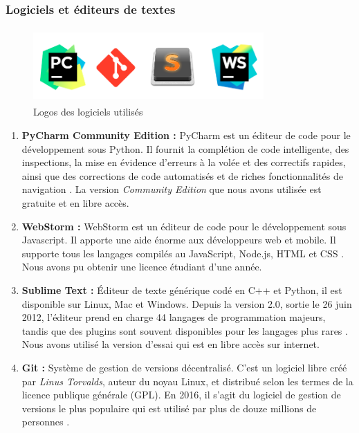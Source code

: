         \subsubsection{Logiciels et éditeurs de textes}
            \begin{figure}[H]
                    \centering
                    \includegraphics[height=80pt,width=250pt]{img/chapter4/tools/software.png}
                    \caption{Logos des logiciels utilisés}
                    \label{}
            \end{figure}
            \begin{enumerate}[leftmargin=*]
                \item{\textbf{PyCharm Community Edition : }}
                PyCharm est un éditeur de code pour le développement sous Python. Il fournit la complétion de code intelligente, des inspections, la mise en évidence d'erreurs à la volée et des correctifs rapides, ainsi que des corrections de code automatisés et de riches fonctionnalités de navigation \cite{pycharm}. La version \emph{Community Edition} que nous avons utilisée est gratuite et en libre accès.\\

                \item{\textbf{WebStorm : }}
                WebStorm est un éditeur de code pour le développement sous Javascript. Il apporte une aide énorme aux développeurs web et mobile. Il supporte tous les langages compilés au JavaScript, Node.js, HTML et CSS \cite{webstorm}. Nous avons pu obtenir une licence étudiant d'une année.\\

                \item{\textbf{Sublime Text : }}
                Éditeur de texte générique codé en C++ et Python, il est disponible sur Linux, Mac et Windows. Depuis la version 2.0, sortie le 26 juin 2012, l'éditeur prend en charge 44 langages de programmation majeurs, tandis que des plugins sont souvent disponibles pour les langages plus rares \cite{sublime}. Nous avons utilisé la version d’essai qui est en libre accès sur internet.\\

                \item{\textbf{Git : }}
                Système de gestion de versions décentralisé. C'est un logiciel libre créé par \emph{Linus Torvalds}, auteur du noyau Linux, et distribué selon les termes de la licence publique générale (GPL). En 2016, il s’agit du logiciel de gestion de versions le plus populaire qui est utilisé par plus de douze millions de personnes \cite{git}.
            \end{enumerate}

